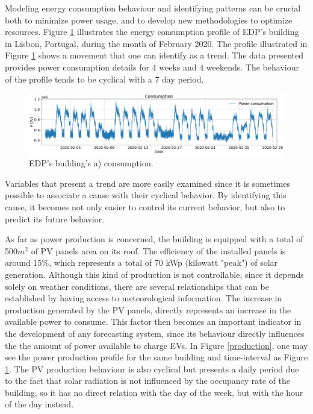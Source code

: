 Modeling energy consumption behaviour and identifying patterns can be crucial both to minimize power usage, and to develop new methodologies to optimize resources. Figure \ref{consumption} illustrates the energy consumption profile of \ac{EDP}'s building in Lisbon, Portugal, during the month of February 2020. The profile illustrated in Figure \ref{consumption} shows a movement that one can identify as a trend. The data presented provides power consumption details for 4 weeks and 4 weekends. The behaviour of the profile tends to be cyclical with a 7 day period. 
\begin{figure}[h!]
    \centering
    \begin{center}
    \includegraphics[width=1\textwidth]{Images/power_consumption.png}
    \caption{EDP's building's a) consumption.}
    \label{consumption}
    \end{center}
\end{figure}


Variables that present a trend are more easily examined since it is sometimes possible to associate a cause with their cyclical behavior. By identifying this cause, it becomes not only easier to control its current behavior, but also to predict its future behavior. 


As far as power production is concerned, the building is equipped with a total of 500$m^2$ of \ac{PV} panels area on its roof. The efficiency of the installed panels is around 15$\%$, which represents a total of 70 kWp (kilowatt "peak") of solar generation. Although this kind of production is not controllable, since it depends solely on weather conditions, there are several relationships that can be established by having access to meteorological information. The increase in production generated by the \ac{PV} panels, directly represents an increase in the available power to consume. This factor then becomes an important indicator in the development of any forecasting system, since its behaviour directly influences the the amount of power available to charge \ac{EV}s. In Figure \ref{production}, one may see the power production profile for the same building and time-interval as Figure \ref{consumption}. The \ac{PV} production behaviour is also cyclical but presents a daily period due to the fact that solar radiation is not influenced by the occupancy rate of the building, so it has no direct relation with the day of the week, but with the hour of the day instead.

